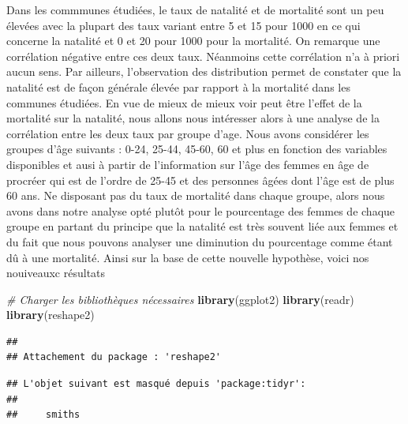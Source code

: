 \documentclass[
]{article}
\newenvironment{Shaded}{\begin{snugshade}}{\end{snugshade}}
\newcommand{\CommentTok}[1]{\textcolor[rgb]{0.56,0.35,0.01}{\textit{#1}}}
\newcommand{\FunctionTok}[1]{\textcolor[rgb]{0.13,0.29,0.53}{\textbf{#1}}}
\newcommand{\NormalTok}[1]{#1}
\begin{document}
Dans les commmunes étudiées, le taux de natalité et de mortalité sont un
peu élevées avec la plupart des taux variant entre 5 et 15 pour 1000 en
ce qui concerne la natalité et 0 et 20 pour 1000 pour la mortalité. On
remarque une corrélation négative entre ces deux taux. Néanmoins cette
corrélation n'a à priori aucun sens. Par ailleurs, l'observation des
distribution permet de constater que la natalité est de façon générale
élevée par rapport à la mortalité dans les communes étudiées. En vue de
mieux de mieux voir peut être l'effet de la mortalité sur la natalité,
nous allons nous intéresser alors à une analyse de la corrélation entre
les deux taux par groupe d'age. Nous avons considérer les groupes d'âge
suivants : 0-24, 25-44, 45-60, 60 et plus en fonction des variables
disponibles et ausi à partir de l'information sur l'âge des femmes en
âge de procréer qui est de l'ordre de 25-45 et des personnes âgées dont
l'âge est de plus 60 ans. Ne disposant pas du taux de mortalité dans
chaque groupe, alors nous avons dans notre analyse opté plutôt pour le
pourcentage des femmes de chaque groupe en partant du principe que la
natalité est très souvent liée aux femmes et du fait que nous pouvons
analyser une diminution du pourcentage comme étant dû à une mortalité.
Ainsi sur la base de cette nouvelle hypothèse, voici nos nouiveauxc
résultats

\begin{Shaded}
\begin{Highlighting}[]
\CommentTok{\# Charger les bibliothèques nécessaires}
\FunctionTok{library}\NormalTok{(ggplot2)}
\FunctionTok{library}\NormalTok{(readr)}
\FunctionTok{library}\NormalTok{(reshape2)}
\end{Highlighting}
\end{Shaded}

\begin{verbatim}
## 
## Attachement du package : 'reshape2'
\end{verbatim}

\begin{verbatim}
## L'objet suivant est masqué depuis 'package:tidyr':
## 
##     smiths
\end{verbatim}
\end{document}
